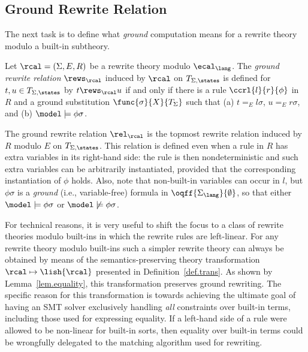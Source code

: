 \subsection{Ground Rewrite Relation}

The next task is to define what \textit{ground} computation means for
a rewrite theory modulo a built-in subtheory.

\begin{definition}\label{def.ground}
  Let $\rcal = (\Sigma, E, R)$ be a rewrite theory modulo
  $\ecal_\lang$.  The \emph{ground rewrite relation} $\rews_{\rcal}$
  induced by $\rcal$ on $T_{\Sigma,\states}$ is defined for $t,u \in
  T_{\Sigma,\states}$ by $t \rews_{\rcal} u$ if and only if there is a
  rule $\ccrl{l}{r}{\phi}$ in $R$ and a ground substitution
  $\func{\sigma}{X}{T_\Sigma}$ such that (a) $t =_E l\sigma$, $u =_E
  r\sigma$, and \label{def.ground.a} (b) $\model \models
  \phi\sigma$. \label{def.ground.b}
%
\end{definition}
%
The ground rewrite relation $\rel_\rcal$ is the topmost rewrite
relation induced by $R$ modulo $E$ on $T_{\Sigma,\states}$. This
relation is defined even when a rule in $R$ has extra variables in its
right-hand side: the rule is then nondeterministic and such extra
variables can be arbitrarily instantiated, provided that the
corresponding instantiation of $\phi$ holds. Also, note that
non-built-in variables can occur in $l$, but $\phi\sigma$ is a {\em
  ground} (i.e., variable-free) formula in
$\oqff{\Sigma_\lang}{\emptyset}$, so that either
$\model\models\phi\sigma$ or $\model\not\models\phi\sigma$.

For technical reasons, it is very useful to shift the focus to a class
of rewrite theories modulo built-ins in which the rewrite rules are
left-linear. For any rewrite theory modulo built-ins such a simpler
rewrite theory can always be obtained by means of the
semantics-preserving theory transformation $\rcal \mapsto
\lish{\rcal}$ presented in Definition~\ref{def.trans}.  As shown by
Lemma~\ref{lem.equality}, this transformation preserves ground
rewriting.  The specific reason for this transformation is towards
achieving the ultimate goal of having an SMT solver exclusively
handling \textit{all} constraints over built-in terms, including those
used for expressing equality.  If a left-hand side of a rule were
allowed to be non-linear for built-in sorts, then equality over
built-in terms could be wrongfully delegated to the matching algorithm
used for rewriting.

